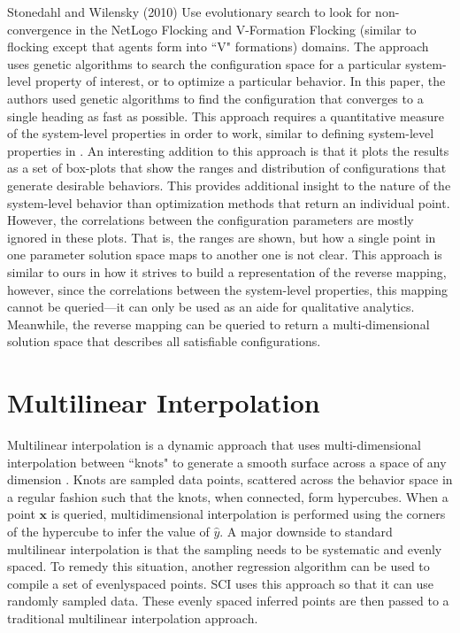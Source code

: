 Stonedahl and Wilensky (2010)\nocite{stonedahl} Use evolutionary search to look for non-convergence in the NetLogo Flocking and V-Formation Flocking (similar to flocking except that agents form into ``V" formations) domains.
The approach uses genetic algorithms to search the configuration space for a particular system-level property of interest, or to optimize a particular behavior.
In this paper, the authors used genetic algorithms to find the configuration that converges to a single heading as fast as possible.
This approach requires a quantitative measure of the system-level properties in order to work, similar to defining system-level properties in \fw.
An interesting addition to this approach is that it plots the results as a set of box-plots that show the ranges and distribution of configurations that generate desirable behaviors.
This provides additional insight to the nature of the system-level behavior than optimization methods that return an individual point.
However, the correlations between the configuration parameters are mostly ignored in these plots.
That is, the ranges are shown, but how a single point in one parameter solution space maps to another one is not clear.
This approach is similar to ours in how it strives to build a representation of the reverse mapping, however, since the correlations between the system-level properties, this mapping cannot be queried---it can only be used as an aide for qualitative analytics.
Meanwhile, the reverse mapping can be queried to return a multi-dimensional solution space that describes all satisfiable configurations.


\section{Multilinear Interpolation}
\label{sec:multilinear}

Multilinear interpolation is a dynamic approach that uses multi-dimensional interpolation between ``knots" to generate a smooth surface across a space of any dimension \cite{davies1997multidimensional}.
Knots are sampled data points, scattered across the behavior space in a regular fashion such that the knots, when connected, form hypercubes.
When a point $\mathbf x$ is queried, multidimensional interpolation is performed using the corners of the hypercube to infer the value of $\hat y$.
A major downside to standard multilinear interpolation is that the sampling needs to be systematic and evenly spaced.
To remedy this situation, another regression algorithm can be used to compile a set of evenlyspaced points.
SCI uses this approach so that it can use randomly sampled data.
These evenly spaced inferred points are then passed to a traditional multilinear interpolation approach.


